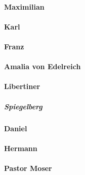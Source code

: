 \paragraph{Maximilian}
\paragraph{Karl}
\paragraph{Franz}
\paragraph{Amalia von Edelreich}
\paragraph{Libertiner}
\subparagraph{Spiegelberg}
\paragraph{Daniel}
\paragraph{Hermann}
\paragraph{Pastor Moser}